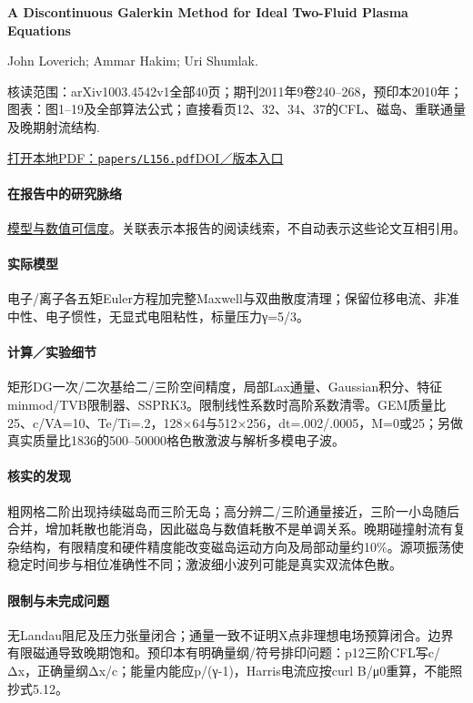 \textbf{A Discontinuous Galerkin Method for Ideal Two-Fluid Plasma Equations}\citep{L156}\

John Loverich;  Ammar Hakim;  Uri Shumlak.

\textsf{核读范围：}arXiv1003.4542v1全部40页；期刊2011年9卷240–268，预印本2010年；\textsf{图表：}图1–19及全部算法公式；直接看页12、32、34、37的CFL、磁岛、重联通量及晚期射流结构.

\href{run:papers/L156.pdf}{打开本地PDF：\texttt{papers/L156.pdf}}\quad\href{https://doi.org/10.4208/cicp.250509.210610a}{DOI／版本入口}

\paragraph{在报告中的研究脉络}\hyperref[ch:numerics]{模型与数值可信度}。关联表示本报告的阅读线索，不自动表示这些论文互相引用。

\paragraph{实际模型}电子/离子各五矩Euler方程加完整Maxwell与双曲散度清理；保留位移电流、非准中性、电子惯性，无显式电阻粘性，标量压力γ=5/3。

\paragraph{计算／实验细节}矩形DG一次/二次基给二/三阶空间精度，局部Lax通量、Gaussian积分、特征minmod/TVB限制器、SSPRK3。限制线性系数时高阶系数清零。GEM质量比25、c/VA=10、Te/Ti=.2，128×64与512×256，dt=.002/.0005，M=0或25；另做真实质量比1836的500–50000格色散激波与解析多模电子波。

\paragraph{核实的发现}粗网格二阶出现持续磁岛而三阶无岛；高分辨二/三阶通量接近，三阶一小岛随后合并，增加耗散也能消岛，因此磁岛与数值耗散不是单调关系。晚期碰撞射流有复杂结构，有限精度和硬件精度能改变磁岛运动方向及局部动量约10\%。源项振荡使稳定时间步与相位准确性不同；激波细小波列可能是真实双流体色散。

\paragraph{限制与未完成问题}无Landau阻尼及压力张量闭合；通量一致不证明X点非理想电场预算闭合。边界有限磁通导致晚期饱和。预印本有明确量纲/符号排印问题：p12三阶CFL写c/Δx，正确量纲Δx/c；能量内能应p/(γ-1)，Harris电流应按curl B/μ0重算，不能照抄式5.12。

